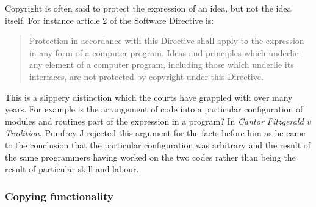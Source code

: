 \documentclass[a4paper,12pt]{article}
\newcommand{\SD}[1][]{Software Directive #1\xspace}
\begin{document}
Copyright is often said to protect the expression of an idea, but not the
idea itself. For instance article 2 of the \SD is:
\begin{quotation}
  Protection in accordance with this Directive shall apply to the expression
  in any form of a computer program. Ideas and principles which underlie any
  element of a computer program, including those which underlie its
  interfaces, are not protected by copyright under this Directive.
\end{quotation}
This is a slippery distinction which the courts have grappled with over many
years. For example is the arrangement of code into a particular
configuration of modules and routines part of the expression in a program? 
In \textit{Cantor Fitzgerald v Tradition}, Pumfrey J rejected this argument
for the facts before him as he came to the conclusion that the particular
configuration was arbitrary and the result of the same programmers having
worked on the two codes rather than being the result of particular skill and
labour. 

\subsubsection{Copying functionality}
\end{document}
